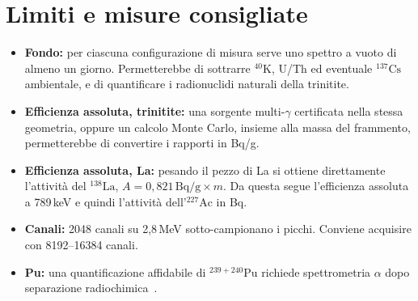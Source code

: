 \documentclass[11pt,a4paper]{article}
\newcommand{\nuc}[2]{\ensuremath{{}^{#1}\mathrm{#2}}}
\newcommand{\gam}{$\gamma$}
\begin{document}
\section{Limiti e misure consigliate}
\begin{itemize}
\item \textbf{Fondo:} per ciascuna configurazione di misura serve uno spettro a vuoto di almeno un giorno. Permetterebbe di sottrarre \nuc{40}{K}, U/Th ed eventuale \nuc{137}{Cs} ambientale, e di quantificare i radionuclidi naturali della trinitite.
\item \textbf{Efficienza assoluta, trinitite:} una sorgente multi-\gam{} certificata nella stessa geometria, oppure un calcolo Monte Carlo, insieme alla massa del frammento, permetterebbe di convertire i rapporti in Bq/g.
\item \textbf{Efficienza assoluta, La:} pesando il pezzo di La si ottiene direttamente l'attività del \nuc{138}{La}, $A=0{,}821\,\mathrm{Bq/g}\times m$. Da questa segue l'efficienza assoluta a 789\,keV e quindi l'attività dell'\nuc{227}{Ac} in Bq.
\item \textbf{Canali:} 2048 canali su 2,8\,MeV sotto-campionano i picchi. Conviene acquisire con 8192--16384 canali.
\item \textbf{Pu:} una quantificazione affidabile di \nuc{239+240}{Pu} richiede spettrometria $\alpha$ dopo separazione radiochimica~\cite{parekh2006,core}.
\end{itemize}
\end{document}
